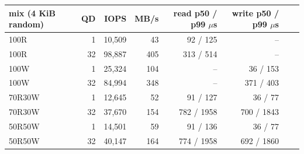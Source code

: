 \begin{tabular}{lrrrrrrr}
\toprule
mix (4 KiB random) & QD & IOPS & MB/s & read p50 / p99 $\mu$s & write p50 / p99 $\mu$s \\
\midrule
100R & 1 & 10,509 & 43 & 92 / 125 & -- \\
100R & 32 & 98,887 & 405 & 313 / 514 & -- \\
100W & 1 & 25,324 & 104 & -- & 36 / 153 \\
100W & 32 & 84,994 & 348 & -- & 371 / 403 \\
70R30W & 1 & 12,645 & 52 & 91 / 127 & 36 / 77 \\
70R30W & 32 & 37,670 & 154 & 782 / 1958 & 700 / 1843 \\
50R50W & 1 & 14,501 & 59 & 91 / 136 & 36 / 77 \\
50R50W & 32 & 40,147 & 164 & 774 / 1958 & 692 / 1860 \\
\bottomrule
\end{tabular}
